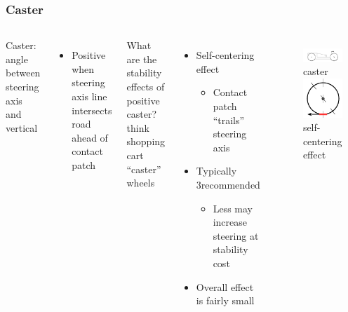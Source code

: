 \documentclass{beamer}
\begin{document}
\begin{frame}
\frametitle{Caster}
\begin{columns}[t]
  Caster: angle between steering axis and vertical
  \begin{itemize}
    \item Positive when steering axis line intersects road ahead of contact patch
  \end{itemize}
  \vspace{\baselineskip}
  What are the stability effects of positive caster?
  {\scriptsize think shopping cart ``caster'' wheels}
   {
  \begin{itemize}  
    \item Self-centering effect
    \begin{itemize}
      \item Contact patch ``trails'' steering axis
    \end{itemize}
    \item Typically 3\textdegree recommended
    \begin{itemize}
      \item Less may increase steering at stability cost
    \end{itemize}
    \item Overall effect is fairly small
  \end{itemize}
  }
  \begin{figure}
    \centering
    \includegraphics[scale=0.3]{images-dis12/car-side-caster} \\
    caster \\
    \vspace{\baselineskip}
     {
    \includegraphics[scale=0.3]{images-dis12/caster-contact} \\
    self-centering effect
    }
  \end{figure}
\end{columns}
\end{frame}
\end{document}
